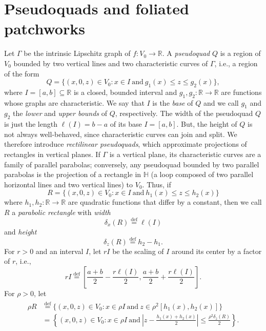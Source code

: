\documentclass[11pt,reqno]{amsart}
\renewcommand{\H}{\mathbb{H}}
\newcommand{\R}{\mathbb{R}}
\newcommand{\0}{\mathbf{0}}
\renewcommand{\1}{\mathbf 1}
\newcommand{\from}{\colon}
\renewcommand{\mid}{:}
\renewcommand{\subset}{\subseteq}
\newcommand{\eqdef}{\stackrel{\mathrm{def}}{=}}
\renewcommand{\le}{\leqslant}
\theoremstyle{remark}
\begin{document}
\section{Pseudoquads and foliated patchworks}\label{sec:pseudoquads}
Let $\Gamma$ be the intrinsic Lipschitz graph of $f\from V_0\to \R$.  A \emph{pseudoquad} $Q$ is a region of $V_0$ bounded by two vertical lines and two characteristic curves of $\Gamma$, i.e., a region of the form
$$Q=\big\{(x,0,z)\in V_0\mid x\in I\ \mathrm{and}\  g_1(x)\le z\le g_2(x)\big\},$$
where $I=[a,b]\subset \R$ is a closed, bounded interval and $g_1,g_2\from \R\to \R$ are functions whose graphs are characteristic.  We say that $I$ is the \emph{base} of $Q$ and we call $g_1$ and $g_2$ the \emph{lower} and \emph{upper bounds} of $Q$, respectively. The width of the pseudoquad $Q$  is just the length $\ell(I)=b-a$ of its base $I=[a,b]$. But, the height of $Q$ is not always well-behaved, since characteristic curves can join and split.  We therefore introduce \emph{rectilinear pseudoquads}, which approximate projections of rectangles in vertical planes.  If $\Gamma$ is a vertical plane, its characteristic curves are a family of parallel parabolas; conversely, any pseudoquad bounded by two parallel parabolas is the projection of a rectangle in $\H$ (a loop composed of two parallel horizontal lines and two vertical lines) to $V_0$.  Thus, if
$$R=\big\{(x,0,z)\in V_0\mid x\in I\ \mathrm{and}\  h_1(x)\le z\le h_2(x)\big\}$$
where $h_1,h_2\from \R\to \R$ are quadratic functions that differ by a constant, then we call $R$ a \emph{parabolic rectangle} with \emph{width} $$\delta_x(R)\eqdef \ell(I)$$ and \emph{height} $$\delta_z(R)\eqdef h_2-h_1.$$  For $r>0$ and an interval $I$, let $rI$ be the scaling of $I$ around its center by a factor of $r$, i.e.,
$$rI\eqdef \left[\frac{a+b}{2}-\frac{r \ell(I)}{2},\frac{a+b}{2}+\frac{r \ell(I)}{2}\right].$$
For $\rho>0$, let
\begin{align}\label{eq:def rho R}
\begin{split}
  \rho R
  &\eqdef \big\{(x,0,z)\in V_0\mid x\in \rho I\ \mathrm{and}\  z\in \rho^2 [h_1(x),h_2(x)]\big\}\\
  &=\left\{(x,0,z)\in V_0\mid x\in \rho I\  \mathrm{and}\  \left|z-\frac{h_1(x)+h_2(x)}{2}\right| \le \frac{\rho^2 \delta_z(R)}{2}\right\}.
  \end{split}
\end{align}
\end{document}
